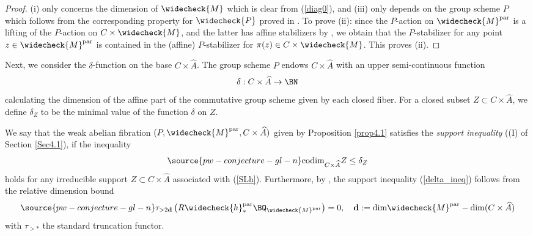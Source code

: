 \begin{proof}
    (i) only concerns the dimension of $\widecheck{M}$ which is clear from (\ref{diag0}), and (iii) only depends on the group scheme $P$ which follows from the corresponding property for $\widecheck{P}$ proved in \cite[Theorem 4.7.2]{dC_SL}. To prove (ii): since the $P$-action on $\widecheck{M}^{\mathrm{par}}$ is a lifting of the $P$-action on $C\times \widecheck{M}$, and the latter has affine stabilizers by \cite{dC_SL}, we obtain that the $P$-stabilizer for any point $z \in \widecheck{M}^{\mathrm{par}}$ is contained in the (affine) $P$-stabilizer for $\pi(z) \in C \times \widecheck{M}$. This proves (ii).
\end{proof}



Next, we consider the $\delta$-function on the base $C\times \widehat{A}$. The group scheme $P$ endows $C\times \widehat{A}$ with an upper semi-continuous function
\[
\delta: C\times \widehat{A} \to \BN
\]
calculating the dimension of the affine part of the commutative group scheme given by each closed fiber. For a closed subset $Z\subset C\times \widehat{A}$, we define $\delta_Z$ to be the minimal value of the function $\delta$ on $Z$.

We say that the weak abelian fibration  $(P, \widecheck{M}^{\mathrm{par}}, C\times \widehat{A})$ given by Proposition \ref{prop4.1} satisfies the \emph{support inequality} ((I) of Section \ref{Sec4.1}), if the inequality
\begin{equation}\label{delta_ineq}
\source{pw-conjecture-gl-n}
\mathrm{codim}_{C\times \widehat{A}}Z \leq \delta_Z
\end{equation}
holds for any irreducible support $Z \subset C\times \widehat{A}$ associated with (\ref{SLh}). Furthermore, by \cite[Theorem 1.8]{MS2}, the support inequality (\ref{delta_ineq}) follows from the relative dimension bound
\begin{equation}\label{relative}
\source{pw-conjecture-gl-n}
   \tau_{> 2\mathbf{d}}\left( R\widecheck{h}^{\mathrm{par}}_* \BQ_{\widecheck{M}^{\mathrm{par}}}\right) = 0, \quad \mathbf{d}: = \mathrm{dim} \widecheck{M}^{\mathrm{par}} - \mathrm{dim} (C\times \widehat{A})
\end{equation}
with $\tau_{>*}$ the standard truncation functor.

